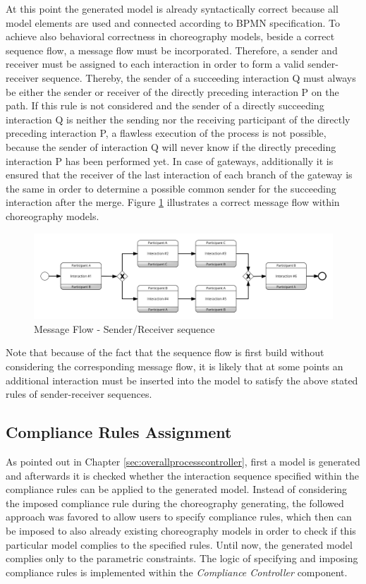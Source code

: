 At this point the generated model is already syntactically correct because all model elements are used and connected according to BPMN specification. To achieve also behavioral correctness in choreography models, beside a correct sequence flow, a message flow must be incorporated. Therefore, a sender and receiver must be assigned to each interaction in order to form a valid sender-receiver sequence. Thereby, the sender of a succeeding interaction Q must always be either the sender or receiver of the directly preceding interaction P on the path. If this rule is not considered and the sender of a directly succeeding interaction Q is neither the sending nor the receiving participant of the directly preceding interaction P, a flawless execution of the process is not possible, because the sender of interaction Q will never know if the directly preceding interaction P has been performed yet. In case of gateways, additionally it is ensured that the receiver of the last interaction of each branch of the gateway is the same in order to determine a possible common sender for the succeeding interaction after the merge. Figure \ref{fig:messageFlow} illustrates a correct message flow within choreography models.  

\begin{figure}[htp]
\includegraphics[width=1\textwidth]{src/images/messageFlow.png}
\caption{Message Flow - Sender/Receiver sequence}
\label{fig:messageFlow}
\end{figure}

Note that because of the fact that the sequence flow is first build without considering the corresponding message flow, it is likely that at some points an additional interaction must be inserted into the model to satisfy the above stated rules of sender-receiver sequences.

\subsection{Compliance Rules Assignment}
As pointed out in Chapter \ref{sec:overallprocesscontroller}, first a model is generated and afterwards it is checked whether the interaction sequence specified within the compliance rules can be applied to the generated model. Instead of considering the imposed compliance rule during the choreography generating, the followed approach was favored to allow users to specify compliance rules, which then can be imposed to also already existing choreography models in order to check if this particular model complies to the specified rules. Until now, the generated model complies only to the parametric constraints. The logic of specifying and imposing compliance rules is implemented within the \textit{Compliance Controller} component.\\

